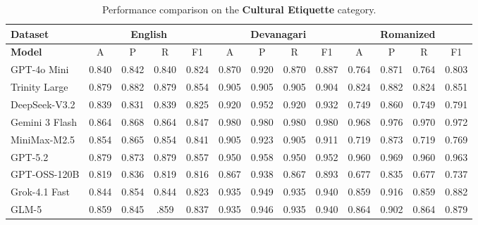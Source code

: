 \documentclass[10pt, a4paper]{article}
\begin{document}
\begin{table}[t]
\centering
\footnotesize
\setlength{\tabcolsep}{4pt}
\renewcommand{\arraystretch}{1.1}

\begin{tabular}{|>{\raggedright\arraybackslash}p{3cm}|cccc|cccc|cccc|}
\hline
\textbf{Dataset}
& \multicolumn{4}{c|}{\textbf{English}}
& \multicolumn{4}{c|}{\textbf{Devanagari}}
& \multicolumn{4}{c|}{\textbf{Romanized}} \\
\hline
\textbf{Model}
& A & P & R & F1 & A & P & R & F1 & A & P & R & F1 \\
\hline
GPT-4o Mini & 0.840& 0.842& 0.840& 0.824& 0.870 & 0.920 & 0.870 & 0.887 & 0.764 & 0.871 & 0.764 & 0.803 \\
\hline
Trinity Large & 0.879& 0.882& 0.879& 0.854& 0.905& 0.905& 0.905& 0.904& 0.824& 0.882& 0.824& 0.851\\
\hline
DeepSeek-V3.2 & 0.839& 0.831& 0.839& 0.825& 0.920& 0.952& 0.920& 0.932& 0.749& 0.860& 0.749& 0.791\\
\hline
Gemini 3 Flash & 0.864& 0.868& 0.864& 0.847& 0.980& 0.980& 0.980& 0.980& 0.968& 0.976& 0.970& 0.972\\
\hline
MiniMax-M2.5 & 0.854& 0.865& 0.854& 0.841& 0.905& 0.923& 0.905& 0.911& 0.719& 0.873& 0.719& 0.769\\
\hline
GPT-5.2 & 0.879& 0.873& 0.879& 0.857& 0.950& 0.958& 0.950& 0.952& 0.960& 0.969& 0.960& 0.963\\
\hline
GPT-OSS-120B & 0.819& 0.836& 0.819& 0.816& 0.867& 0.938& 0.867& 0.893& 0.677& 0.835& 0.677& 0.737\\
\hline
Grok-4.1 Fast & 0.844& 0.854& 0.844& 0.823& 0.935& 0.949& 0.935& 0.940& 0.859& 0.916& 0.859& 0.882\\
\hline
GLM-5 & 0.859& 0.845& .859& 0.837& 0.935& 0.946& 0.935& 0.940& 0.864& 0.902& 0.864& 0.879\\
\hline
\end{tabular}
\caption{Performance comparison on the \textbf{Cultural Etiquette} category.}
\label{tab:cultural_results}
\end{table}
\end{document}
